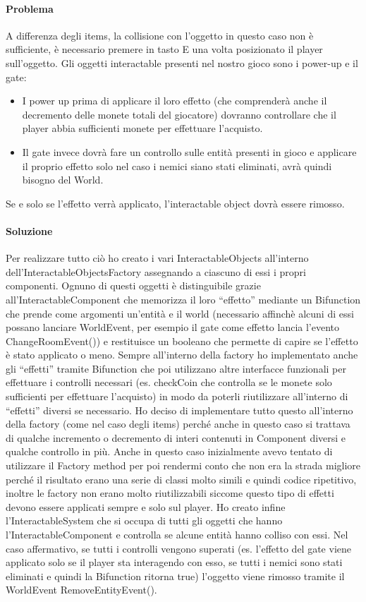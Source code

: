 \documentclass[a4paper,12pt]{report}
\begin{document}
\paragraph*{Problema}
	A differenza degli items, la collisione con l'oggetto in questo caso non è sufficiente, è necessario premere in tasto E una volta posizionato il player sull'oggetto.
	Gli oggetti interactable presenti nel nostro gioco sono i power-up e il gate:
	\begin{itemize} 
		\item I power up prima di applicare il loro effetto (che comprenderà anche il decremento delle monete totali del giocatore) dovranno controllare che il player abbia sufficienti monete per effettuare l'acquisto.
		\item Il gate invece dovrà fare un controllo sulle entità presenti in gioco e applicare il proprio effetto solo nel caso i nemici siano stati eliminati, avrà quindi bisogno del World.
	\end{itemize}
	Se e solo se l'effetto verrà applicato, l'interactable object dovrà essere rimosso. 

\paragraph*{Soluzione}
	Per realizzare tutto ciò ho creato i vari InteractableObjects all'interno dell'InteractableObjectsFactory assegnando a ciascuno di essi i propri componenti. Ognuno di questi oggetti è distinguibile grazie all'InteractableComponent che memorizza il loro “effetto” mediante un Bifunction che prende come argomenti un'entità e il world (necessario affinchè alcuni di essi possano lanciare WorldEvent, per esempio il gate come effetto lancia l'evento ChangeRoomEvent()) e restituisce un booleano che permette di capire se l'effetto è stato applicato o meno.
	Sempre all'interno della factory ho implementato anche gli “effetti” tramite Bifunction che poi utilizzano altre interfacce funzionali per effettuare i controlli necessari (es. checkCoin che controlla se le monete solo sufficienti per effettuare l'acquisto) in modo da poterli riutilizzare all'interno di “effetti” diversi se necessario. Ho deciso di implementare tutto questo all'interno della factory (come nel caso degli items) perché anche in questo caso si trattava di qualche incremento o decremento di interi contenuti in Component diversi e qualche controllo in più. Anche in questo caso inizialmente avevo tentato di utilizzare il Factory method per poi rendermi conto che non era la strada migliore perché il risultato erano una serie di classi molto simili e quindi codice ripetitivo, inoltre le factory non erano molto riutilizzabili siccome questo tipo di effetti devono essere applicati sempre e solo sul player.
	Ho creato infine l'InteractableSystem che si occupa di tutti gli oggetti che hanno l'InteractableComponent e controlla se alcune entità hanno colliso con essi. Nel caso affermativo, se tutti i controlli vengono superati (es. l'effetto del gate viene applicato solo se il player sta interagendo con esso, se tutti i nemici sono stati eliminati e quindi la Bifunction ritorna true) l'oggetto viene rimosso tramite il WorldEvent RemoveEntityEvent(). 
	
\end{document}
